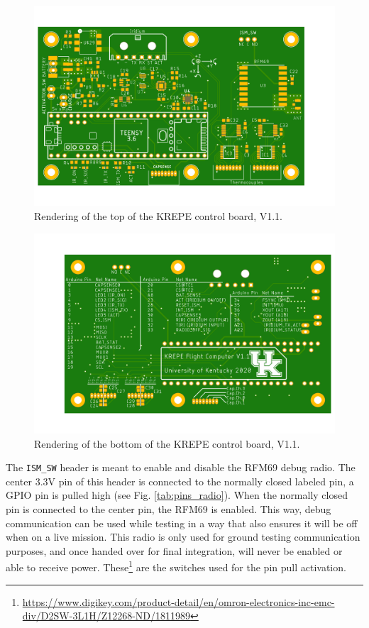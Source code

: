 \documentclass{article}
\begin{document}
\begin{figure}[H]
    \centering
    \includegraphics[width=\textwidth]{images/krepe-top.png}
    \caption{Rendering of the top of the KREPE control board, V1.1.}
    \label{fig:board-top}
\end{figure}


\begin{figure}[H]
    \centering
    \includegraphics[width=\textwidth]{images/krepe-bottom.png}
    \caption{Rendering of the bottom of the KREPE control board, V1.1.}
    \label{fig:board-bottom}
\end{figure}

The \texttt{ISM\_SW} header is meant to enable and disable the RFM69 debug radio. The center 3.3V pin of this header is connected to the normally closed labeled pin, a GPIO pin is pulled high (see Fig. \ref{tab:pins_radio}). When the normally closed pin is connected to the center pin, the RFM69 is enabled. This way, debug communication can be used while testing in a way that also ensures it will be off when on a live mission. This radio is only used for ground testing communication purposes, and once handed over for final integration, will never be enabled or able to receive power. These\footnote{\url{https://www.digikey.com/product-detail/en/omron-electronics-inc-emc-div/D2SW-3L1H/Z12268-ND/1811989}} are the switches used for the pin pull activation.
\end{document}

